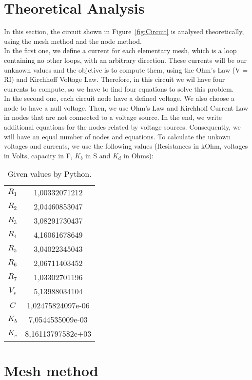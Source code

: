 \newpage
\section{Theoretical Analysis}
\label{sec:analysis}
In this section, the circuit shown in Figure~\ref{fig:Circuit} is analysed
theoretically, using the mesh method and the node method. \\
In the first one, we define a current for each elementary mesh, 
which is a loop containing no other loops, with an arbitrary direction.
These currents will be our unknown values and the objetive is to compute them, using the Ohm's Law (V = RI) and Kirchhoff Voltage Law. 
Therefore, in this circuit we wil have four currents to compute, so we have to find four equations to solve this problem. \\
\noindent In the second one, each circuit node have a defined voltage. We also choose a node to have a null voltage.
Then, we use Ohm's Law and Kirchhoff Current Law in nodes that are not connected to a voltage source.
In the end, we write additional equations for the nodes related by voltage sources.
Consequently, we will have an equal number of nodes and equations.
To calculate the unkown voltages and currents, we use the following values (Resistances in kOhm, voltages in Volts, capacity in F, $K_b$ in S and $K_d$ in Ohms):
\begin{table}[h!]
\centering
\begin{small}
\caption{Given values by Python.} \label{Table1}
\begin{tabular}{|c|c|}
\hline
$R_1$ & 1,00332071212 \\
$R_2$  & 2,04460853047 \\
$R_3$  & 3,08291730437 \\
$R_4$ & 4,16061678649 \\
$R_5$  & 3,04022345043 \\
$R_6$ & 2,06711403452 \\
$R_7$ & 1,03302701196 \\
$V_s$ & 5,13988034104\\
$C$ & 1,02475824097e-06 \\
$K_b$ & 7,0544535009e-03 \\
$K_c$ & 8,16113797582e+03\\
\hline
\end{tabular}
\end{small}
\end{table}

\newpage

\section{Mesh method}

